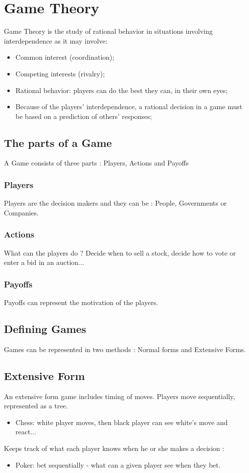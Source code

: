 \section{Game Theory}
Game Theory is the study of rational behavior in situations involving interdependence as it may involve:
\begin{itemize}
\item Common interest (coordination);
\item Competing interests (rivalry);
\item Rational behavior: players can do the best they can, in their own eyes;
\item Because of the players' interdependence, a rational decision in a game must be based on a prediction of others' responses;
\end{itemize}
\clearpage

\subsection{The parts of a Game} 
A Game consists of three parts : 
Players, Actions and Payoffs
\subsubsection{Players}
Players are the decision makers and they can be : People, Governments or Companies.
\subsubsection{Actions}
What can the players do ?
Decide when to sell a stock, decide how to vote or enter a bid in an auction...
\subsubsection{Payoffs}
Payoffs can represent the motivation of the players.

\subsection{Defining Games} Games can be represented in two methods : Normal forms and Extensive Forms.

\subsection{Extensive Form}
An extensive form game includes timing of moves. 
Players move sequentially, represented as a tree.
\begin{itemize}
\item Chess: white player moves, then black player can see white's move and react...
\end{itemize}
Keeps track of what each player knows when he or she makes a decision :
\begin{itemize}
\item Poker: bet sequentially - what can a given player see when they bet. 
\end{itemize}

